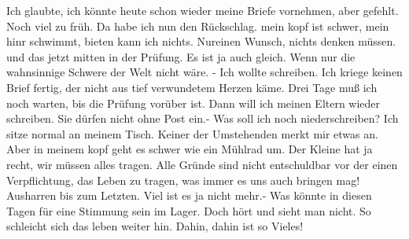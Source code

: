 \def\day{10. Juni 1944}
\mktitle

Ich glaubte, ich k\"{o}nnte heute schon wieder meine Briefe vornehmen, aber gefehlt.
Noch viel zu fr\"{u}h.
Da habe ich nun den R\"{u}ckschlag.
mein kopf ist schwer, mein hinr schwimmt, bieten kann ich nichts.
Nureinen Wunsch, nichts denken m\"{u}ssen.
und das jetzt mitten in der Pr\"{u}fung.
Es ist ja auch gleich.
Wenn nur die wahnsinnige Schwere der Welt nicht w\"{a}re.
- Ich wollte schreiben.
Ich kriege keinen Brief fertig, der nicht aus tief verwundetem Herzen k\"{a}me.
Drei Tage mu{\ss} ich noch warten, bis die Pr\"{u}fung vor\"{u}ber ist.
Dann will ich meinen Eltern wieder schreiben.
Sie d\"{u}rfen nicht ohne Post ein.-
Was soll ich noch niederschreiben?
Ich sitze normal an meinem Tisch.
Keiner der Umstehenden merkt mir etwas an.
Aber in meinem kopf geht es schwer wie ein M\"{u}hlrad um.
Der Kleine hat ja recht, wir m\"{u}ssen alles tragen.
Alle Gr\"{u}nde sind nicht entschuldbar vor der einen Verpflichtung, das Leben zu tragen, was immer es uns auch bringen mag!
Ausharren bis zum Letzten.
Viel ist es ja nicht mehr.-
Was k\"{o}nnte in diesen Tagen f\"{u}r eine Stimmung sein im Lager.
Doch h\"{o}rt und sieht man nicht.
So schleicht sich das leben weiter hin.
Dahin, dahin ist so Vieles!


\clearpage
